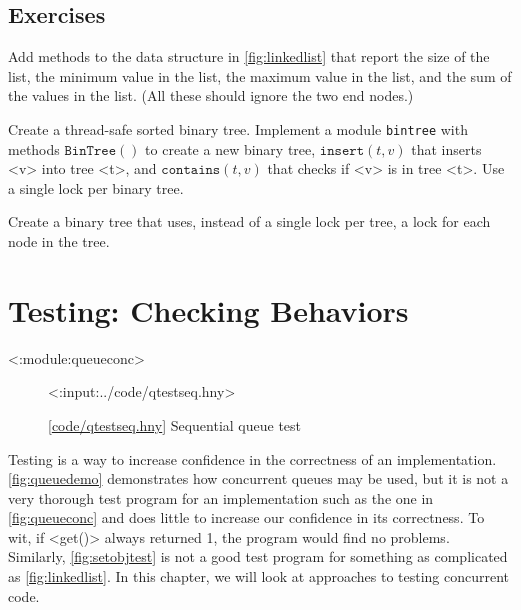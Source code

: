 \documentclass{report}
\newcommand{\harmonylink}[1]{%
[\href{https://harmony.cs.cornell.edu/#1}{\underline{#1}}]%
}
\newenvironment{code}{
\tcolorbox
}{
\endtcolorbox
}
\begin{document}
\section*{Exercises}
\begin{problems}
\item Add methods to the data structure in \autoref{fig:linkedlist}
that report the size of the list, the minimum value in the
list, the maximum value in the list, and the sum of the values in the list.
(All these should ignore the two end nodes.)
\item Create a thread-safe sorted binary tree.  Implement a module \texttt{bintree}
with methods
$\mathtt{BinTree}()$ to create a new binary tree, $\mathtt{insert}(t, v)$ that inserts <{v}> into
tree <{t}>, and $\mathtt{contains}(t, v)$ that checks if <{v}> is in tree <{t}>.  Use a single
lock per binary tree.
\item Create a binary tree that uses, instead of a single lock per tree,
a lock for each node in the tree.
\end{problems}

\chapter{Testing: Checking Behaviors}
\label{ch:testing}
<{:module:queueconc}>

\begin{figure}
\begin{code}
<{:input:../code/qtestseq.hny}>
\end{code}
\caption{\harmonylink{code/qtestseq.hny} Sequential queue test}
\label{fig:qtestseq}
\end{figure}

Testing is a way to increase confidence in the correctness
of an implementation.
\autoref{fig:queuedemo} demonstrates how concurrent queues
may be used, but it is not a very thorough test program
for an implementation such as the one in \autoref{fig:queueconc}
and does little to increase our confidence in its correctness.
To wit, if <{get()}> always returned 1, the program
would find no problems.
Similarly, \autoref{fig:setobjtest} is not a good test program
for something as complicated as \autoref{fig:linkedlist}.
In this chapter, we will look at approaches to testing
concurrent code.
\end{document}
